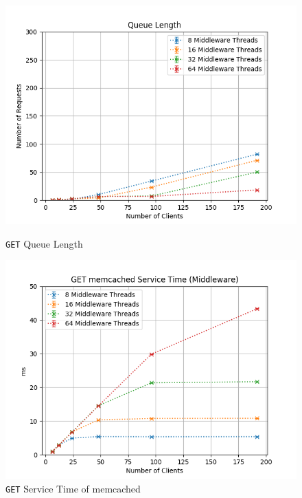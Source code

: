 \documentclass[11pt,a4paper]{article}
\begin{document}
\begin{figure}[H]
	\centering
    \begin{minipage}{0.5\textwidth}
        \includegraphics[width=\textwidth]{../illustrations/plots/2_2_two_middlewares/0-1/middleware_queue_length.png}
        \caption{\texttt{GET} Queue Length}
        \label{fig:two_middlewares_get_ql}
    \end{minipage}\hfill
    \begin{minipage}{0.5\textwidth}
        \centering
        \includegraphics[width=\textwidth]{../illustrations/plots/2_2_two_middlewares/0-1/middleware_get_service_time_ms.png}
        \caption{\texttt{GET} Service Time of memcached}
        \label{fig:two_middlewares_get_st_mw}
    \end{minipage}
\end{figure}
\end{document}
